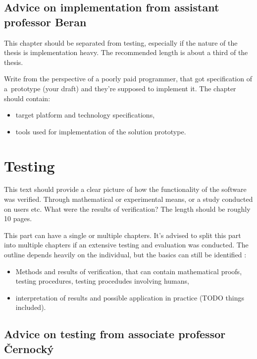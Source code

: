 \subsection*{Advice on implementation from assistant professor Beran}

This chapter should be separated from testing, especially if the nature of the thesis is implementation heavy. The recommended length is about a third of the thesis.

Write from the perspective of a poorly paid programmer, that got specification of a~prototype (your draft) and they're supposed to implement it. The chapter should contain:
\begin{itemize}
  \item{target platform and technology specifications,}
  \item{tools used for implementation of the solution prototype.}
\end{itemize}


\section{Testing}
\label{testovani}

This text should provide a clear picture of how the functionality of the software was verified. Through mathematical or experimental means, or a study conducted on users etc. What were the results of verification? The length should be roughly 10 pages.

This part can have a single or multiple chapters. It's advised to split this part into multiple chapters if an extensive testing and evaluation was conducted. The outline depends heavily on the individual, but the basics can still be identified \cite{Zemcik}: 
\begin{itemize}
  \item{Methods and results of verification, that can contain mathematical proofs, testing procedures, testing procedudes involving humans,}
  \item{interpretation of results and possible application in practice (TODO things included).}
\end{itemize}

\subsection*{Advice on testing from associate professor Černocký}

